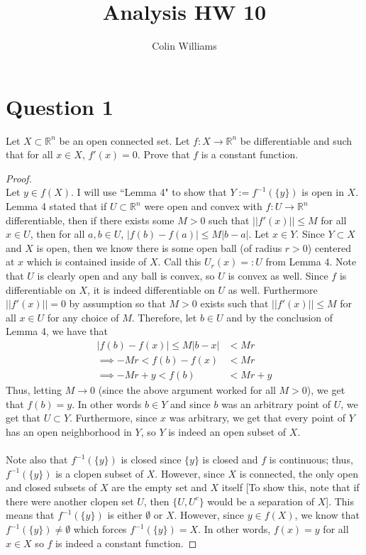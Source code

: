 \documentclass[10pt,a4paper]{article}
\title{Analysis HW 10}
\author{Colin Williams}
\theoremstyle{definition}
\theoremstyle{definition}
\numberwithin{equation}{section}
\begin{document}
\maketitle

\section*{Question 1}
Let $X \subset \mathbb{R}^n$ be an open connected set. Let $f: X \to \mathbb{R}^n$ be differentiable and such that for all $x \in X$, $f'(x) = 0$. Prove that $f$ is a constant function. 

\begin{proof}$ $
\\Let $y \in f(X)$. I will use ``Lemma 4" to show that $Y := f^{-1}(\{y\})$ is open in $X$. Lemma 4 stated that if $U \subset \mathbb{R}^n$ were open and convex with $f: U \to \mathbb{R}^n$ differentiable, then if there exists some $M > 0$ such that $||f'(x)|| \leq M$ for all $x \in U$, then for all $a, b \in U$, $|f(b) - f(a)| \leq M|b - a|$. Let $x \in Y$. Since $Y \subset X$ and $X$ is open, then we know there is some open ball (of radius $r > 0$) centered at $x$ which is contained inside of $X$. Call this $U_r(x) =: U$ from Lemma 4. Note that $U$ is clearly open and any ball is convex, so $U$ is convex as well. Since $f$ is differentiable on $X$, it is indeed differentiable on $U$ as well. Furthermore $||f'(x)|| = 0$ by assumption so that $M > 0$ exists such that $||f'(x)|| \leq M$ for all $x \in U$ for any choice of $M$. Therefore, let $b \in U$ and by the conclusion of Lemma 4, we have that 
\begin{align*}
|f(b) - f(x)| \leq M|b - x| &< Mr\\
\implies -Mr < f(b) - f(x) &< Mr\\
\implies -Mr + y < f(b) &< Mr + y
\end{align*}
Thus, letting $M \to 0$ (since the above argument worked for all $M > 0$), we get that $f(b) = y$. In other words $b \in Y$ and since $b$ was an arbitrary point of $U$, we get that $U \subset Y$. Furthermore, since $x$ was arbitrary, we get that every point of $Y$ has an open neighborhood in $Y$, so $Y$ is indeed an open subset of $X$. 
\\
\\Note also that $f^{-1}(\{y\})$ is closed since $\{y\}$ is closed and $f$ is continuous; thus, $f^{-1}(\{y\})$ is a clopen subset of $X$. However, since $X$ is connected, the only open and closed subsets of $X$ are the empty set and $X$ itself [To show this, note that if there were another clopen set $U$, then $\{U, U^c\}$ would be a separation of $X$]. This means that $f^{-1}(\{y\})$ is either $\emptyset$ or $X$. However, since $y \in f(X)$, we know that $f^{-1}(\{y\}) \neq \emptyset$ which forces $f^{-1}(\{y\}) = X$. In other words, $f(x) = y$ for all $x \in X$ so $f$ is indeed a constant function. 
\end{proof}
\end{document}
